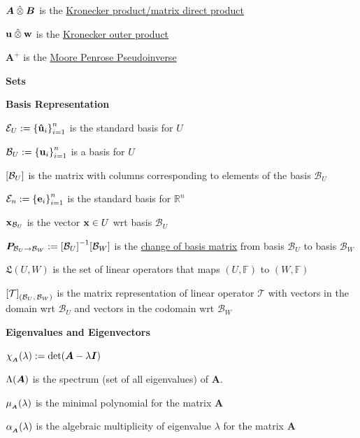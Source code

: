 \documentclass[11pt]{article}
\begin{document}
  \(\bm{A} \mathbin{\hat{\otimes}} \bm{B}\) is the \href{https://www.wikiwand.com/en/Kronecker_product}{Kronecker product/matrix direct product}

  \(\mathbf{u} \mathbin{\hat{\otimes}} \mathbf{w}\) is the \href{https://www.wikiwand.com/en/Kronecker_product}{Kronecker outer product}

  \(\bm{A}^+\) is the
  \href{https://www.wikiwand.com/en/Moore-Penrose_inverse}{Moore Penrose Pseudoinverse}

  \vspace{12pt}

  \textbf{Sets}

  \textbf{Basis Representation}

  \(\mathcal{E}_U := {\left\{ \vu{u}_i \right\}}_{i = 1}^n\) is the standard basis for \(U\)

  \(\mathcal{B}_U := {\left\{ \mathbf{u}_i \right\}}_{i = 1}^n\) is a basis for \(U\)

  \({\left[ \mathcal{B}_U \right]}\) is the matrix with columns corresponding to elements of the basis \(\mathcal{B}_U\)

  \(\mathcal{E}_n := {\left\{ \mathbf{e}_i \right\}}_{i = 1}^n\) is the standard basis for \(\mathbb{R}^n\)

  \(\mathbf{x}_{\mathcal{B}_U}\) is the vector \(\mathbf{x} \in U\) wrt basis \(\mathcal{B}_U\)

  \(\bm{P}_{\mathcal{B}_U \to \mathcal{B}_W} := {\left[ \mathcal{B}_U \right]}^{-1}{\left[ \mathcal{B}_W \right]}\) is the
  \href{https://www.youtube.com/watch?v=P2LTAUO1TdA}{change of basis matrix}
  from basis \(\mathcal{B}_U\) to basis \(\mathcal{B}_W\)

  \(\mathfrak{L}(U, W)\) is the set of linear operators that maps
  \((U, \mathbb{F})\) to \((W, \mathbb{F})\)

  \({\left[ \mathcal{T} \right]}_{(\mathcal{B}_U,\, \mathcal{B}_W)}\) is the matrix representation of linear operator \(\mathcal{T}\)
  with vectors in the domain wrt \(\mathcal{B}_U\) and vectors in the codomain
  wrt \(\mathcal{B}_W\)

  \vspace{12pt}

  \textbf{Eigenvalues and Eigenvectors}

  \(\chi_{_{\bm{A}}}(\lambda) := \mathrm{det}{\left( \bm{A} - \lambda\bm{I} \right)}\)

  \(\Lambda{\left( \bm{A} \right)}\) is the spectrum (set of all eigenvalues) of \(\bm{A}\).

  \(\mu_{_{\bm{A}}}(\lambda)\) is the minimal polynomial for the matrix \(\bm{A}\)

  \(\alpha_{_{\bm{A}}}(\lambda)\) is the algebraic multiplicity of eigenvalue \(\lambda\) for the matrix \(\bm{A}\)
\end{document}

